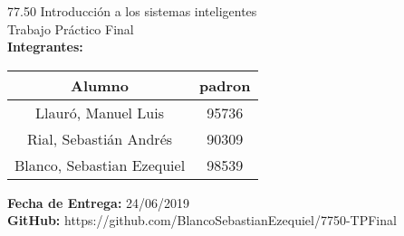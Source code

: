 \begin{titlepage}
  \vspace*{\fill}
  \begin{center}
    \Large 77.50 Introducción a los sistemas inteligentes \\
    \Huge Trabajo Práctico Final\\
    \bigskip\bigskip\bigskip
    \large\textbf{Integrantes:} \\
    \begin{center}
      \begin{tabular}{||c | c||}
        \hline
        Alumno & padron \\ [0.5ex]
        \hline\hline
        Llauró, Manuel Luis & 95736 \\
        \hline
        Rial, Sebastián Andrés & 90309 \\
        \hline
        Blanco, Sebastian Ezequiel & 98539 \\
        \hline
      \end{tabular}
    \end{center}
    \textbf{Fecha de Entrega:} 24/06/2019\\
    \textbf{GitHub:} https://github.com/BlancoSebastianEzequiel/7750-TPFinal\\

  \end{center}
  \vspace*{\fill}
\end{titlepage}
